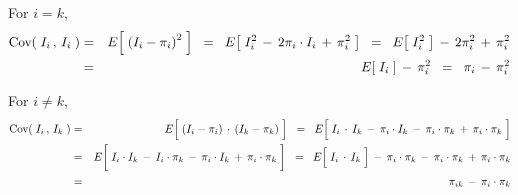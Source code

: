 \noindent
For $i = k$,
\begin{eqnarray*}
\textnormal{Cov}\!\left(\;I_{i}\,,\,I_{i}\;\right)
& = &
	E\!\left[\;\left(I_{i}-\pi_{i}\right)^{2}\;\right]
\;\; = \;\;
	E\!\left[\;I_{i}^{2} \, - \, 2\pi_{i} \cdot I_{i} \,+\, \pi_{i}^{2}\;\right]
\;\; = \;\;
	E\!\left[\;I_{i}^{2}\;\right] \, - \, 2\pi_{i}^{2} \,+\, \pi_{i}^{2}
\\
& = &
	E\!\left[\;I_{i}\;\right] \, - \,\pi_{i}^{2}
\;\; = \;\;
	\pi_{i} \, - \,\pi_{i}^{2}
\end{eqnarray*}

\noindent
For $i \neq k$,
\begin{eqnarray*}
\Cov\!\left(\;I_{i}\,,\,I_{k}\;\right)
& = &
	E\!\left[\;\left(I_{i}-\pi_{i}\right)\overset{{\color{white}-}}{\cdot}\left(I_{k}-\pi_{k}\right)\;\right]
\;\; = \;\;
	E\!\left[\;
		I_{i} \overset{{\color{white}-}}{\cdot} I_{k}
		\, - \, \pi_{i} \cdot I_{k}
		\, - \, \pi_{i} \cdot \pi_{k}
		\, + \, \pi_{i} \cdot \pi_{k}
		\;\right]
\\
& = &
	E\!\left[\;
		I_{i} \overset{{\color{white}\vert}}{\cdot} I_{k}
		\, - \, I_{i} \cdot \pi_{k}
		\, - \, \pi_{i} \cdot I_{k}
		\, + \, \pi_{i} \cdot \pi_{k}
		\;\right]
\;\; = \;\;
	E\!\left[\; I_{i} \overset{{\color{white}-}}{\cdot} I_{k} \;\right]
		\, - \, \pi_{i} \cdot \pi_{k}
		\, - \, \pi_{i} \cdot \pi_{k}
		\, + \, \pi_{i} \cdot \pi_{k}
\\
& = &
	\pi_{ik} \, - \, \pi_{i} \cdot \pi_{k} 
\end{eqnarray*}

